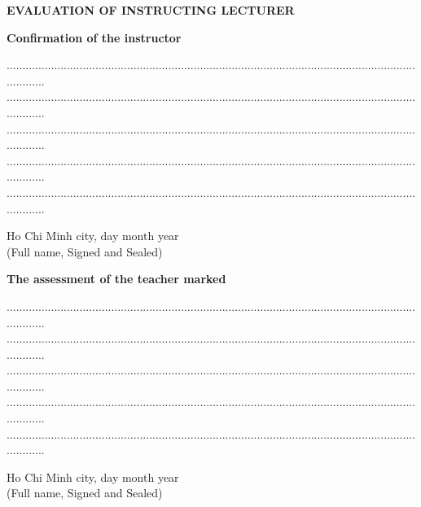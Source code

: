 \newpage
\begin{center}
\textbf{\Large{EVALUATION OF INSTRUCTING LECTURER}}
\end{center}
\textbf{Confirmation of the instructor}


\begin{center}
.............................................................................................................................................
.............................................................................................................................................
.............................................................................................................................................
.............................................................................................................................................
.............................................................................................................................................
\end{center}

\vspace{0.5cm}
\hspace{8cm}
Ho Chi Minh city, day \hspace {0.5cm} month \hspace {0.5cm} year\\	
\vspace{0.5cm}
\hspace{11cm}
(Full name, Signed and Sealed)

\vspace{2cm}

\begin{flushleft}
\textbf{\large{The assessment of the teacher marked}}
\end{flushleft}
\begin{center}
.............................................................................................................................................
.............................................................................................................................................
.............................................................................................................................................
.............................................................................................................................................
.............................................................................................................................................
\\
\end{center}

\vspace{0.5cm}
\hspace{8cm}
Ho Chi Minh city, day \hspace {0.5cm} month \hspace {0.5cm} year\\
\vspace{0.5cm}
\hspace{11cm}
(Full name, Signed and Sealed)


\newpage

